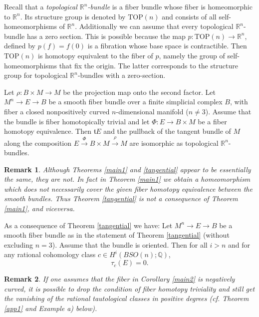 \documentclass[onecolumn,notitlepage,11pt]{article}
\newcommand{\Q}{\mathbb{Q}}
\newcommand{\R}{\mathbb{R}}
\newtheorem{rmk}{Remark}
\newenvironment{customthm}[1]
  {\renewcommand\theinnercustomthm{#1}\innercustomthm}
  {\endinnercustomthm}  %
\newenvironment{customcoro}[1]
  {\renewcommand\theinnercustomcoro{#1}\innercustomcoro}
  {\endinnercustomcoro}
\theoremstyle{definition}
\begin{document}
Recall that a \textit{topological $\R^n$-bundle} is a 
fiber bundle whose fiber is
homeomorphic to $\R^n$. Its structure group is
denoted by $\mbox{TOP}(n)$ and consists of all self-homeomorphisms of $\R^n$. 
Additionally we can assume that every topological
$\R^n$-bundle has a zero section. This is possible because
the map $p:\mbox{TOP}(n)\to \R^n$, defined by $p(f)=f(0)$ is a fibration whose
base space is contractible. Then $\mbox{TOP}(n)$ is homotopy equivalent to
the fiber of $p$, namely
the group of self-homeomorphisms that fix the origin. The latter
corresponds to the structure group for topological $\R^n$-bundles with a zero-section.

Let $\rho: B\times M\to M$ be the 
projection map onto the second factor.
\begin{customthm}{B}\label{tangential}
Let $M^n\to E\to B$ be a smooth fiber bundle over a 
finite simplicial complex $B$, with fiber a closed
nonpositively curved $n$-dimensional manifold ($n\neq 3$).
Assume that the bundle is
fiber homotopically trivial and let $\Phi:E\to B\times M$ be a fiber
homotopy equivalence.
Then $\mathfrak{t}E$ and the pullback of
the tangent bundle of $M$ along
the composition $E\xrightarrow{\Phi}B\times M\xrightarrow{\rho} M$
are isomorphic as topological $\R^n$-bundles.
\end{customthm}
\begin{rmk}
Although Theorems \ref{main1} and \ref{tangential} appear to be
essentially the same, they are not. In fact in Theorem
\ref{main1} we obtain a homeomorphism which does
not necessarily cover the given fiber
homotopy equivalence between the smooth bundles. Thus Theorem
\ref{tangential} is not a consequence of Theorem
\ref{main1}, and viceversa.
\end{rmk}
As a consequence of Theorem \ref{tangential} we have:
\begin{customcoro}{B.1}\label{main2}
Let $M^n\to E\to B$ be a smooth fiber bundle as in the statement of Theorem
\ref{tangential} (without excluding $n=3$). 
Assume that the bundle is oriented. Then
for all $i>n$ and for any rational cohomology class $c\in H^i(BSO(n);\Q)$,
\begin{equation}\label{eq1}
\tau_{c}(E) = 0.
\end{equation}
\end{customcoro}
\begin{rmk}
If one assumes that the fiber in Corollary \ref{main2} is
negatively curved, it is
possible to drop the condition of fiber 
homotopy triviality and still
get the vanishing of the rational tautological 
classes in positive degrees 
(cf. Theorem \ref{app1} and Example a) below).
\end{rmk}
\end{document}
